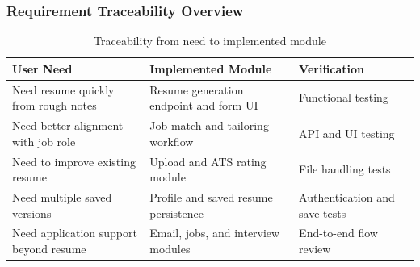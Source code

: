 \subsubsection{Requirement Traceability Overview}
\begin{table}[H]
\centering
\caption{Traceability from need to implemented module}
\begin{tabular}{|p{4.2cm}|p{4.6cm}|p{3.4cm}|}
\hline
\textbf{User Need} & \textbf{Implemented Module} & \textbf{Verification} \\
\hline
Need resume quickly from rough notes & Resume generation endpoint and form UI & Functional testing \\
\hline
Need better alignment with job role & Job-match and tailoring workflow & API and UI testing \\
\hline
Need to improve existing resume & Upload and ATS rating module & File handling tests \\
\hline
Need multiple saved versions & Profile and saved resume persistence & Authentication and save tests \\
\hline
Need application support beyond resume & Email, jobs, and interview modules & End-to-end flow review \\
\hline
\end{tabular}
\end{table}
